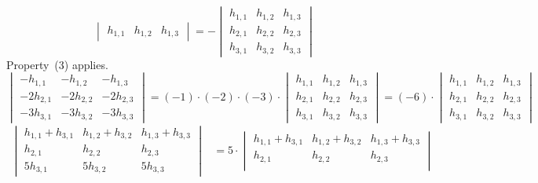 \begin{exercises}
\begin{answer}
\begin{exparts}
\begin{equation*}
\begin{vmatrix}
              h_{1,1}  &h_{1,2} &h_{1,3}
            \end{vmatrix}
            =
            -\begin{vmatrix}
              h_{1,1}  &h_{1,2} &h_{1,3} \\
              h_{2,1}  &h_{2,2} &h_{2,3} \\
              h_{3,1}  &h_{3,2} &h_{3,3} 
            \end{vmatrix}
          \end{equation*}
        \partsitem Property~(3) applies.
          \begin{equation*}
            \begin{vmatrix}
             -h_{1,1}   &-h_{1,2}  &-h_{1,3} \\
             -2h_{2,1}  &-2h_{2,2} &-2h_{2,3} \\
             -3h_{3,1}  &-3h_{3,2} &-3h_{3,3}
            \end{vmatrix}
            =
            (-1)\cdot(-2)\cdot(-3)\cdot
            \begin{vmatrix}
             h_{1,1}   &h_{1,2}  &h_{1,3} \\
             h_{2,1}   &h_{2,2}  &h_{2,3} \\
             h_{3,1}   &h_{3,2}  &h_{3,3}
            \end{vmatrix}
            =
            (-6)\cdot
            \begin{vmatrix}
             h_{1,1}   &h_{1,2}  &h_{1,3} \\
             h_{2,1}   &h_{2,2}  &h_{2,3} \\
             h_{3,1}   &h_{3,2}  &h_{3,3}
            \end{vmatrix}
          \end{equation*}
        \partsitem 
          \begin{align*}
          \begin{vmatrix}
            h_{1,1}+h_{3,1}  &h_{1,2}+h_{3,2} &h_{1,3}+h_{3,3} \\
            h_{2,1}          &h_{2,2}         &h_{2,3} \\
            5h_{3,1}         &5h_{3,2}        &5h_{3,3}
          \end{vmatrix}
          &=
          5\cdot     
          \begin{vmatrix}
            h_{1,1}+h_{3,1}  &h_{1,2}+h_{3,2} &h_{1,3}+h_{3,3} \\
            h_{2,1}          &h_{2,2}         &h_{2,3} \\

\end{vmatrix}
\end{align*}
\end{exparts}
\end{answer}
\end{exercises}
